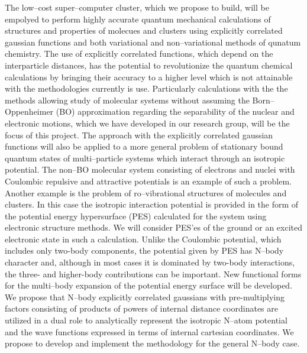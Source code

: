 The low--cost super--computer cluster, 
which we propose to build, will
be empolyed to perform highly accurate quantum mechanical 
calculations of structures and properties of molecues
and clusters using explicitly correlated gaussian
functions and both variational and non--variational
methods of qunatum chemistry. 
The use of explicitly correlated functions, which
depend on the interparticle distances, has the
potential to revolutionize the quantum chemical
calculations by bringing their accuracy to a higher level
which is not
attainable with the methodologies currently is use.
Particularly 
calculations with the
the methods allowing study of molecular systems without
assuming the Born--Oppenheimer (BO) approximation regarding the
separability of the nuclear and electronic motions, which we have
developed in our research group,\cite{1,2,3,4}
will be the focus of this project.
The approach with the explicitly correlated
gaussian functions will also be applied to
a more general problem of stationary bound
quantum states of multi--particle
systems which interact through an isotropic potential.
The non--BO molecular system consisting of electrons and nuclei
with
Coulombic repulsive and attractive potentials
is an example of such a problem.
Another example
is the problem of ro--vibrational structures
of molecules and clusters.
In this case the isotropic interaction potential is provided
in the form of the potential energy hypersurface (PES)
calculated for the system using electronic structure methods.
We will consider PES'es of the
ground or an excited electronic state in such a calculation.
Unlike the Coulombic potential, which includes only two-body
components, the potential given by PES has N--body character and,
although in most cases it is dominated by two-body interactions,
the three- and higher-body contributions can be important.
New functional forms for the multi--body expansion of the potential
energy
surface  
will be developed.
We propose that N--body
explicitly correlated gaussians with pre-multiplying factors consisting
of
products of powers of internal distance coordinates are utilized in a
dual
role to analytically represent the isotropic N--atom potential and the
wave functions expressed in terms of internal cartesian coordinates.
We propose to develop and implement the methodology for the general
N--body case.


